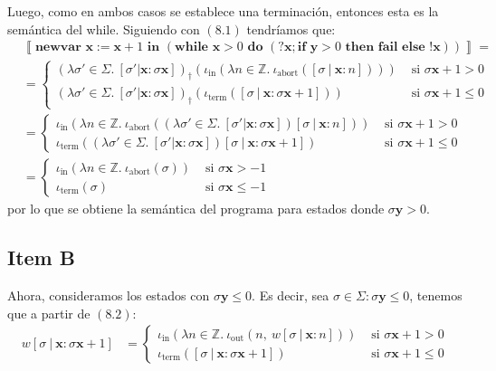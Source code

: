 \documentclass{article}
\newcommand{\sem}[1]{\left\llbracket #1\right\rrbracket}
\newcommand{\Z}{\mathbb{Z}}
\newcommand{\x}{\textbf{x}}
\newcommand{\y}{\textbf{y}}
\newcommand{\cif}[3]{\textbf{if }#1\textbf{ then }#2\textbf{ else }#3}
\newcommand{\cnewvar}[3]{\textbf{newvar }#1 := #2\textbf{ in }#3}
\newcommand{\cwhile}[2]{\textbf{while }#1\textbf{ do }#2}
\newcommand{\cfail}{\textbf{fail}}
\newcommand{\iterm}[1]{\iota_\text{term}\left(#1\right)}
\newcommand{\iabort}[1]{\iota_\text{abort}\left(#1\right)}
\newcommand{\iout}[2]{\iota_\text{out}\left(#1,\ #2\right)}
\newcommand{\iin}[2]{\iota_\text{in}\left(\lambda #1 \in \Z .\ #2\right)}
\begin{document}
Luego, como en ambos casos se establece una terminación, entonces esta es la semántica del while.
Siguiendo con $(8.1)$ tendríamos que:
\begin{equation*}
  \begin{aligned}
    & \sem{\cnewvar{\x}{\x+1}{(\cwhile{\x>0}{(?\x; \cif{\y>0}{\cfail}{!\x})})}} = \\ 
    &= \begin{cases}
      (\lambda \sigma' \in \Sigma .\ [\sigma' | \x : \sigma\x])_\dagger (\iin{n}{\iabort{[\sigma\ |\ \x : n]}}) &\text{ si }\sigma\x+1 > 0 \\ 
      (\lambda \sigma' \in \Sigma .\ [\sigma' | \x : \sigma\x])_\dagger (\iterm{[\sigma\ |\ \x : \sigma\x+1]}) &\text{ si }\sigma\x+1 \leq 0
    \end{cases} \\ 
    &= \begin{cases}
      \iin{n}{\iabort{(\lambda \sigma' \in \Sigma .\ [\sigma' | \x : \sigma\x]) [\sigma\ |\ \x : n]}} &\text{ si }\sigma\x+1 > 0 \\ 
      \iterm{(\lambda \sigma' \in \Sigma .\ [\sigma' | \x : \sigma\x]) [\sigma\ |\ \x : \sigma\x+1]} &\text{ si }\sigma\x+1 \leq 0
    \end{cases} \\ 
    &= \begin{cases}
      \iin{n}{\iabort{\sigma}} &\text{ si }\sigma\x > -1 \\ 
      \iterm{\sigma} &\text{ si }\sigma\x \leq -1
    \end{cases}
  \end{aligned}
\end{equation*}
por lo que se obtiene la semántica del programa para estados donde $\sigma\y > 0$.

\subsection*{Item B}
Ahora, consideramos los estados con $\sigma\y \leq 0$.
Es decir, sea $\sigma \in \Sigma : \sigma\y \leq 0$, tenemos que a partir de $(8.2)$:
\begin{equation*}
  \begin{aligned}
    w[\sigma\ |\ \x : \sigma\x+1] &= \begin{cases}
      \iin{n}{\iout{n}{w [\sigma\ |\ \x : n]}} &\text{ si }\sigma\x+1 > 0 \\ 
      \iterm{[\sigma\ |\ \x : \sigma\x+1]} &\text{ si }\sigma\x+1 \leq 0
    \end{cases}
  \end{aligned}
\end{equation*}
\end{document}
